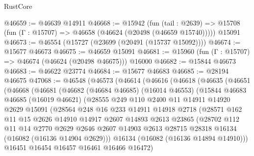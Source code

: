 \begin{lexlean}{RustCore}
\begin{coremodule}
@46659 := @46639 @14911
@46668 := @15942
    (fun (tail : @2639) => @15708 (fun (Γ : @15707) => @46658 (@46624 (@20498 (@46659 @15740)))))
    @15091
@46673 := @46554 (@15727 (@23699 (@20491 (@15737 @15092))))
@46674 := @15677 @46673
@46675 := @46659 @15091
@46681 := @15960 (fun (Γ : @15707) => @46674 (@46624 (@20498 @46675))) @16000
@46682 := @15844 @46673
@46683 := @46622 @23774
@46684 := @15677 @46683
@46685 := @28194 @46675
@47068 := @46548
    (@46573
      (@46614
        (@46616
          (@46618
            (@46635
              (@46651
                (@46668
                  (@46681
                    (@46682
                      (@46684 @46685)
                      (@16014 @46553)
                      (@15844
                        @46683
                        @46685
                        (@16019 @46621)
                        (@28555
                          @249
                          @110
                          @2400
                          @11
                          @14911
                          @14920
                          @2629
                          @15091
                          (@28564
                            @248
                            @16
                            @233
                            @14911
                            @14918
                            @2718
                            (@28571
                              @162
                              @11
                              @15
                              @2626
                              @14910
                              @14917
                              @2607
                              @14893
                              @2613
                              @23865
                              (@28702
                                @112
                                @11
                                @14
                                @2770
                                @2629
                                @2646
                                @2607
                                @14903
                                @2613
                                @28715
                                @28318
                                @16134
                                (@16082 (@16136 @14904 @2629)))
                              @16134
                              (@16082 (@16136 @14894 @14910)))
                            @16451
                            @16454
                            @16457
                            @16461
                            @16466
                            @16472)

\end{coremodule}
\end{lexlean}
